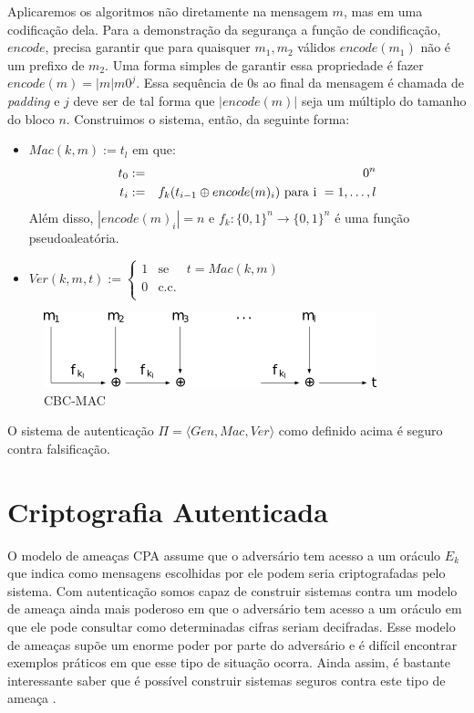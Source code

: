 Aplicaremos os algoritmos não diretamente na mensagem $m$, mas em uma codificação dela.
Para a demonstração da segurança a função de condificação, $encode$, precisa garantir que para quaisquer $m_1, m_2$ válidos $encode(m_1)$ não é um prefixo de $m_2$.
Uma forma simples de garantir essa propriedade é fazer $encode(m) = |m|m0^j$.
Essa sequência de $0$s ao final da mensagem é chamada de {\em padding} e $j$ deve ser de tal forma que $|encode(m)|$ seja um múltiplo do tamanho do bloco $n$.
Construimos o sistema, então, da seguinte forma:
\begin{itemize}
\item $Mac(k, m) := t_l$ em que:
  \begin{eqnarray*}
  t_0 & := & 0^n \\
  t_i & := & f_k(t_{i-1} \oplus encode(m)_i) \textrm{ para i } = 1, \dots, l 
  \end{eqnarray*}
 Além disso, $|encode(m)_i| = n$ e $f_k: \{0,1\}^n \to \{0,1\}^n$ é uma função pseudoaleatória.
\item $Ver(k, m, t) :=  \left\{
    \begin{array}{lcl}
      1 & \textrm{se} & t = Mac(k,m)\\
      0 & \textrm{c.c.} &\\
    \end{array}
    \right.$
\end{itemize}

\begin{figure}[htbp]
  \centering
    \includegraphics[width=.5\textwidth]{imagens/CBC-MAC.png}
  \caption{CBC-MAC}
  \label{fig:cbc-mac}
\end{figure}


\begin{theorem}
  O sistema de autenticação $\Pi = \langle Gen, Mac, Ver \rangle$ como definido acima é seguro contra falsificação.
\end{theorem}

\section{Criptografia Autenticada}
\label{label}

O modelo de ameaças CPA assume que o adversário tem acesso a um oráculo $E_k$ que indica como mensagens escolhidas por ele podem seria criptografadas pelo sistema.
Com autenticação somos capaz de construir sistemas contra um modelo de ameaça ainda mais poderoso em que o adversário tem acesso a um oráculo em que ele pode consultar como determinadas cifras seriam decifradas.
Esse modelo de ameaças supõe um enorme poder por parte do adversário e é difícil encontrar exemplos práticos em que esse tipo de situação ocorra.
Ainda assim, é bastante interessante saber que é possível construir sistemas seguros contra este tipo de ameaça \cite{Naor90}.

